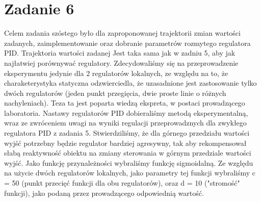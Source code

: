 \chapter{Zadanie 6}
Celem zadania szóstego było dla zaproponowanej trajektorii zmian wartości zadanych, zaimplementowanie
oraz dobranie parametrów rozmytego regulatora PID. Trajektoria wartości zadanej
Jest taka sama jak w zadniu 5, aby jak najłatwiej porównywać regulatory. Zdecydowaliśmy się na przeprowadzenie eksperymentu
jedynie dla 2 regulatorów lokalnych, ze względu na to, że charaketerystyka statyczna odzwierciedla, że
uzasadnione jest zastosowanie tylko dwóch regulatorów (jeden punkt przegięcia, dwie proste linie o różnych nachyleniach).
Teza ta jest poparta wiedzą ekspreta, w postaci prowadzącego laboratoria.
Nastawy regulatorów PID dobieraliśmy metodą eksperymentalną, wraz ze zwróceniem uwagi na wyniki
regulacji przeprowadznych dla zwykłego regulatora PID z zadania 5. Stwierdziliśmy, że
dla górnego przedziału wartości wyjść potrzebny będzie regulator bardziej agresywny, tak
aby rekompensował słabą reaktywność obiektu na zmiany sterowania w górnym przedziale wartości wyjść.
Jako funkcję przynależności wybraliśmy funkcję sigmoidalną. Ze względu na użycie dwóch
regulatorów lokalnych, jako parametry tej funkcji wybraliśmy c = 50 (punkt przecięć funkcji dla obu regulatorów),
oraz d = 10 ("stromość" funkcji), jako podaną przez prowadzącego odpowiednią wartość.

